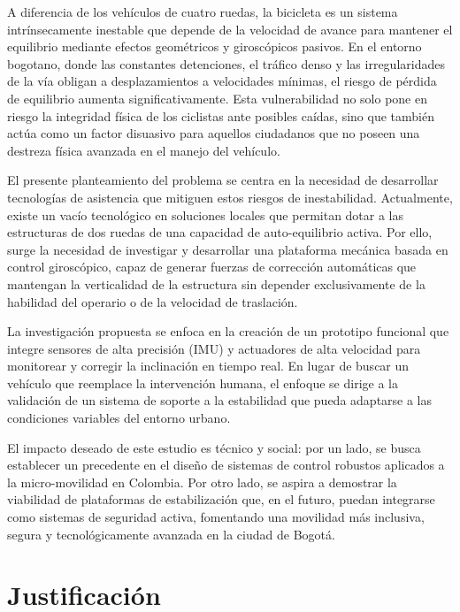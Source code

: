 \documentclass[12pt,letterpaper]{report}
\begin{document}
A diferencia de los vehículos de cuatro ruedas, la bicicleta es un sistema intrínsecamente inestable que depende de la velocidad de avance para mantener el equilibrio mediante efectos geométricos y giroscópicos pasivos. En el entorno bogotano, donde las constantes detenciones, el tráfico denso y las irregularidades de la vía obligan a desplazamientos a velocidades mínimas, el riesgo de pérdida de equilibrio aumenta significativamente. Esta vulnerabilidad no solo pone en riesgo la integridad física de los ciclistas ante posibles caídas, sino que también actúa como un factor disuasivo para aquellos ciudadanos que no poseen una destreza física avanzada en el manejo del vehículo.

El presente planteamiento del problema se centra en la necesidad de desarrollar tecnologías de asistencia que mitiguen estos riesgos de inestabilidad. Actualmente, existe un vacío tecnológico en soluciones locales que permitan dotar a las estructuras de dos ruedas de una capacidad de auto-equilibrio activa. Por ello, surge la necesidad de investigar y desarrollar una plataforma mecánica basada en control giroscópico, capaz de generar fuerzas de corrección automáticas que mantengan la verticalidad de la estructura sin depender exclusivamente de la habilidad del operario o de la velocidad de traslación.

La investigación propuesta se enfoca en la creación de un prototipo funcional que integre sensores de alta precisión (IMU) y actuadores de alta velocidad para monitorear y corregir la inclinación en tiempo real. En lugar de buscar un vehículo que reemplace la intervención humana, el enfoque se dirige a la validación de un sistema de soporte a la estabilidad que pueda adaptarse a las condiciones variables del entorno urbano.

El impacto deseado de este estudio es técnico y social: por un lado, se busca establecer un precedente en el diseño de sistemas de control robustos aplicados a la micro-movilidad en Colombia. Por otro lado, se aspira a demostrar la viabilidad de plataformas de estabilización que, en el futuro, puedan integrarse como sistemas de seguridad activa, fomentando una movilidad más inclusiva, segura y tecnológicamente avanzada en la ciudad de Bogotá.

\chapter{Justificación}
\end{document}
